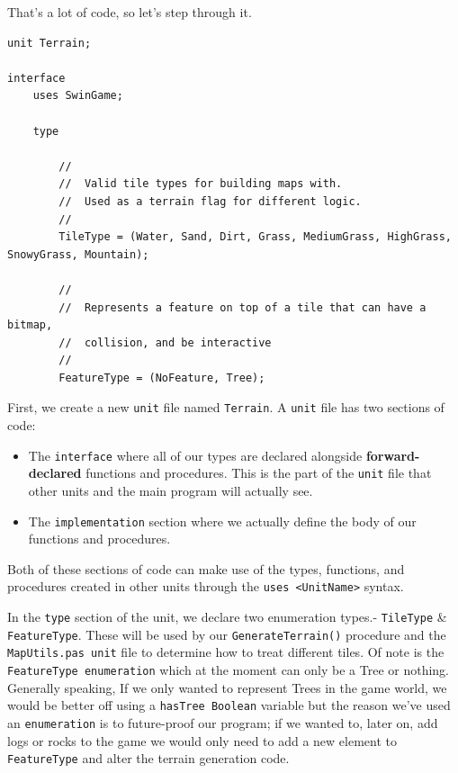\documentclass{article}
\begin{document}
That's a lot of code, so let's step through it.

\vspace{1mm}

\begin{verbatim}
unit Terrain;

interface
	uses SwinGame;

	type

		//
		//	Valid tile types for building maps with.
		//	Used as a terrain flag for different logic.
		//
		TileType = (Water, Sand, Dirt, Grass, MediumGrass, HighGrass, SnowyGrass, Mountain);

		//
		//	Represents a feature on top of a tile that can have a bitmap,
		//	collision, and be interactive
		//
		FeatureType = (NoFeature, Tree);
\end{verbatim}

First, we create a new \texttt{unit} file named \texttt{Terrain}. A \texttt{unit} file has two sections of code: 

\begin{itemize}

\item
The \texttt{interface} where all of our types are declared alongside \textbf{forward-declared} functions and procedures. This is the part of the \texttt{unit} file that other units and the main program will actually see.

\item
The  \texttt{implementation} section where we actually define the body of our functions and procedures.

\end{itemize}

Both of these sections of code can make use of the types, functions, and procedures created in other units through the \texttt{uses <UnitName>} syntax.

In the \texttt{type} section of the unit, we declare two enumeration types.- \texttt{TileType} \& \texttt{FeatureType}. These will be used by our \texttt{GenerateTerrain()} procedure and the \texttt{MapUtils.pas unit} file to determine how to treat different tiles. Of note is the \texttt{FeatureType enumeration} which at the moment can only be a Tree or nothing. Generally speaking, If we only wanted to represent Trees in the game world, we would be better off using a \texttt{hasTree Boolean} variable but the reason we've used an \texttt{enumeration} is to future-proof our program; if we wanted to, later on, add logs or rocks to the game we would only need to add a new element to \texttt{FeatureType} and alter the terrain generation code.
\end{document}
